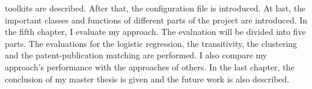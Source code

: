 toolkits are described. After that, the configuration file is introduced. At last, the important classes and functions of different parts of the project are introduced. In the fifth chapter, I evaluate my approach. The evaluation will be divided into five parts. The evaluations for the logistic regression, the transitivity, the clustering and the patent-publication matching are performed. I also compare my approach's performance with the approaches of others. In the last chapter, the conclusion of my master thesis is given and the future work is also described.
\newpage
\thispagestyle{empty}
\rule{0cm}{5cm}
